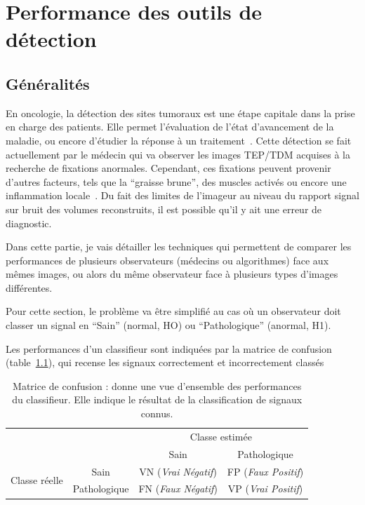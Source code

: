 \chapter{Performance des outils de détection}
\label{lab:chapCAD}
	\section{Généralités}

En oncologie, la détection des sites tumoraux est une étape capitale dans la prise en charge des patients. Elle permet l'évaluation de l'état d'avancement de la maladie, ou encore d'étudier la réponse à un traitement~\cite{dimitrakopoulou2002role}. Cette détection se fait actuellement par le médecin qui va observer les images TEP/TDM acquises à la recherche de fixations anormales. Cependant, ces fixations peuvent provenir d'autres facteurs, tels que la ``graisse brune'', des muscles activés ou encore une inflammation locale~\cite{bordessoule2006impact}. Du fait des limites de l'imageur au niveau du rapport signal sur bruit des volumes reconstruits, il est possible qu'il y ait une erreur de diagnostic.

Dans cette partie, je vais détailler les techniques qui permettent de comparer les performances de plusieurs observateurs (médecins ou algorithmes) face aux mêmes images, ou alors du même observateur face à plusieurs types d'images différentes.

Pour cette section, le problème va être simplifié au cas où un observateur doit classer un signal en ``Sain'' (normal, HO) ou ``Pathologique'' (anormal, H1). 

Les performances d'un classifieur sont indiquées par la matrice de confusion (table~\ref{tab:confusion}), qui recense les signaux correctement et incorrectement classés 

\begin{table}[h]
	\label{tab:confusion}
	\begin{tabular}{cc c|c|}
		& & \multicolumn{2}{c}{Classe estimée} \\
		\cline{3-4}	
		& & \multicolumn{1}{|c|}{Sain} & Pathologique \\ 
		\cline{2-4}
		\multicolumn{1}{c|}{\multirow{2}{*}{Classe réelle}} & \multicolumn{1}{|c|}{Sain} & VN (\emph{Vrai Négatif}) & FP (\emph{Faux Positif})\\
		\cline{2-4}
		\multicolumn{1}{c|}{} & \multicolumn{1}{|c|}{Pathologique} & FN (\emph{Faux Négatif}) & VP (\emph{Vrai Positif})\\
		\cline{2-4}
	\end{tabular}
	\caption[Matrice de confusion]{Matrice de confusion : donne une vue
d'ensemble des performances du classifieur. Elle indique le résultat de la
classification de signaux connus.}
\end{table}

